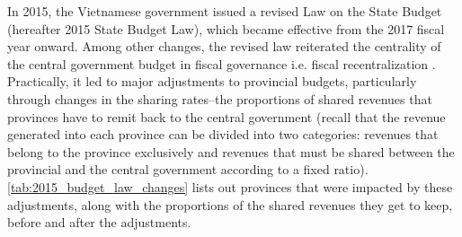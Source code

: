 \documentclass[12pt]{article}
\newcommand{\1}{\mathbbm{1}}
\begin{document}
In 2015, the Vietnamese government issued a revised Law on the State Budget (hereafter 2015 State Budget Law), which became effective from the 2017 fiscal year onward. Among other changes, the revised law reiterated the centrality of the central government budget in fiscal governance i.e. fiscal recentralization \citep{Vu2016}. Practically, it led to major adjustments to provincial budgets, particularly through changes in the sharing rates--the proportions of shared revenues that provinces have to remit back to the central government (recall that the revenue generated into each province can be divided into two categories: revenues that belong to the province exclusively and revenues that must be shared between the provincial and the central government according to a fixed ratio). \autoref{tab:2015_budget_law_changes} lists out provinces that were impacted by these adjustments, along with the proportions of the shared revenues they get to keep, before and after the adjustments.
\end{document}
